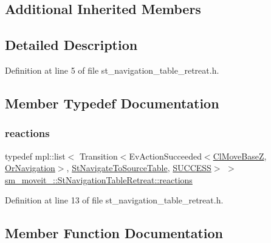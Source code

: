 \subsection*{Additional Inherited Members}


\subsection{Detailed Description}


Definition at line 5 of file st\+\_\+navigation\+\_\+table\+\_\+retreat.\+h.



\subsection{Member Typedef Documentation}
\mbox{\label{structsm__moveit__4_1_1StNavigationTableRetreat_abc8d03746076d2cf10d7c9b8cd31537c}} 
\subsubsection{\texorpdfstring{reactions}{reactions}}
{\footnotesize\ttfamily typedef mpl\+::list$<$ Transition$<$Ev\+Action\+Succeeded$<$\hyperlink{classcl__move__base__z_1_1ClMoveBaseZ}{Cl\+Move\+BaseZ}, \hyperlink{classsm__moveit__4_1_1OrNavigation}{Or\+Navigation}$>$, \hyperlink{structsm__moveit__4_1_1StNavigateToSourceTable}{St\+Navigate\+To\+Source\+Table}, \hyperlink{classSUCCESS}{S\+U\+C\+C\+E\+SS}$>$ $>$ \hyperlink{structsm__moveit__4_1_1StNavigationTableRetreat_abc8d03746076d2cf10d7c9b8cd31537c}{sm\+\_\+moveit\+\_\+::\+St\+Navigation\+Table\+Retreat\+::reactions}}



Definition at line 13 of file st\+\_\+navigation\+\_\+table\+\_\+retreat.\+h.



\subsection{Member Function Documentation}
\mbox{\label{structsm__moveit__4_1_1StNavigationTableRetreat_a499aca1e3a8cf140072466558bf99cf8}} 
